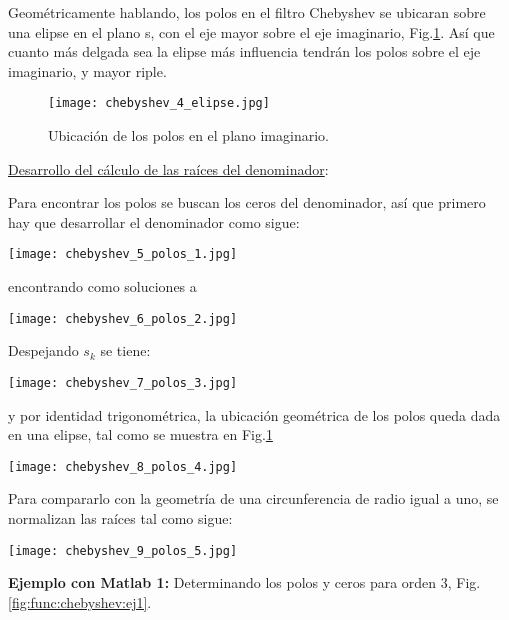 \documentclass[informe.tex]{subfiles}
\begin{document}
Geométricamente hablando, los polos en el filtro Chebyshev se ubicaran sobre una elipse en el plano s, con el eje mayor sobre el eje imaginario, Fig.\ref{fig:chebyshev:elipse}. Así que cuanto más delgada sea la elipse más influencia tendrán los polos sobre el eje imaginario, y mayor riple.\newline		
	
	\begin{figure}[h!]
		\centering
		\texttt{[image: chebyshev\_4\_elipse.jpg]}
		\caption{Ubicación de los polos en el plano imaginario.}
		\label{fig:chebyshev:elipse}
	\end{figure}
	
\underline{Desarrollo del cálculo de las raíces del denominador}:\newline

	Para encontrar los polos se buscan los ceros del denominador, así que primero hay que desarrollar el denominador como sigue: \newline
	\begin{center}
		\texttt{[image: chebyshev\_5\_polos\_1.jpg]}
	\end{center}
	
encontrando como soluciones a \newline
	
	\begin{center}
		\texttt{[image: chebyshev\_6\_polos\_2.jpg]}
	\end{center}
	
Despejando $s_k$ se tiene:
	
	\begin{center}
		\texttt{[image: chebyshev\_7\_polos\_3.jpg]}
	\end{center}

	y por identidad trigonométrica, la ubicación geométrica de los polos queda dada en una elipse, tal como se muestra en Fig.\ref{fig:chebyshev:elipse}\newline
	\begin{center}
		\texttt{[image: chebyshev\_8\_polos\_4.jpg]}	
	\end{center}

Para compararlo con la geometría de una circunferencia de radio igual a uno, se normalizan las raíces tal como sigue:
	
	\begin{center}\texttt{[image: chebyshev\_9\_polos\_5.jpg]}\end{center}		

\textbf{Ejemplo con Matlab 1:} Determinando los polos y ceros para orden 3, Fig. \ref{fig:func:chebyshev:ej1}.\newline 
  
\end{document}

